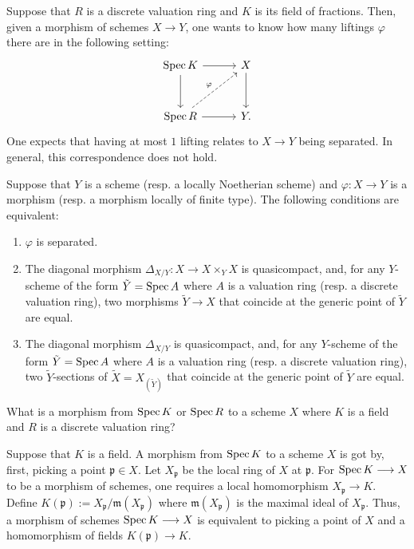 \documentclass [11 pt, oneside] {article}
\begin{document}
Suppose that $R$ is a discrete valuation ring and $K$ is its field of fractions. Then, given a morphism of schemes $X\longrightarrow Y$, one wants to know how many liftings $\varphi$ there are in the following setting:
\[
\begin{tikzcd}[column sep = 3 em, row sep = 3 em]
	\Spec K \ar[r]\ar[d]&X\ar[d]\\ \Spec R \ar[r]\ar[ur,dashed,"\varphi"] &Y.
\end{tikzcd}
\]
One expects that having at most $1$ lifting relates to $X\longrightarrow Y$ being separated. In general, this correspondence does not hold.
\begin{proposition}\label{}\text{}
Suppose that $Y$ is a scheme (resp. a locally Noetherian scheme) and $\varphi : X\longrightarrow Y$ is a morphism (resp. a morphism locally of finite type). The following conditions are equivalent:
\begin{enumerate}
	\item $\varphi$ is separated.
	\item The diagonal morphism $\Delta_{X/Y} : X\longrightarrow X\times_Y X$ is quasicompact, and, for any $Y$-scheme of the form $\tilde Y =\operatorname{Spec} A$ where $A$ is a valuation ring (resp. a discrete valuation ring), two morphisms $\tilde Y\longrightarrow X$ that coincide at the generic point of $\tilde Y$ are equal.
	\item The diagonal morphism $\Delta_{X/Y}$ is quasicompact, and, for any $Y$-scheme of the form $\tilde Y = \operatorname{Spec} A$ where $A$ is a valuation ring (resp. a discrete valuation ring), two $\tilde Y$-sections of $\tilde X = X_{(\tilde Y)}$ that coincide at the generic point of $\tilde Y$ are equal.
\end{enumerate}
\end{proposition}

\begin{problem}
	What is a morphism from $\operatorname{Spec} K$ or $\operatorname{Spec} R$ to a scheme $X$ where $K$ is a field and $R$ is a discrete valuation ring?
\end{problem}

Suppose that $K$ is a field. A morphism from $\operatorname{Spec} K$ to a scheme $X$ is got by, first, picking a point $\mathfrak{p}\in X$. Let $X_{\mathfrak{p}}$ be the local ring of $X$ at $\mathfrak{p}$. For $\operatorname{Spec} K\longrightarrow X$ to be a morphism of schemes, one requires a local homomorphism $X_{\mathfrak{p}}\longrightarrow K$. Define $K(\mathfrak{p}):= X_{\mathfrak{p}}/\mathfrak{m}(X_{\mathfrak{p}})$ where  $\mathfrak{m}(X_{\mathfrak{p}})$ is the maximal ideal of $X_{\mathfrak{p}}$. Thus, a morphism of schemes $\operatorname{Spec} K\longrightarrow X$ is equivalent to picking a point of $X$ and a homomorphism of fields $K(\mathfrak{p})\longrightarrow K$.
\end{document}
